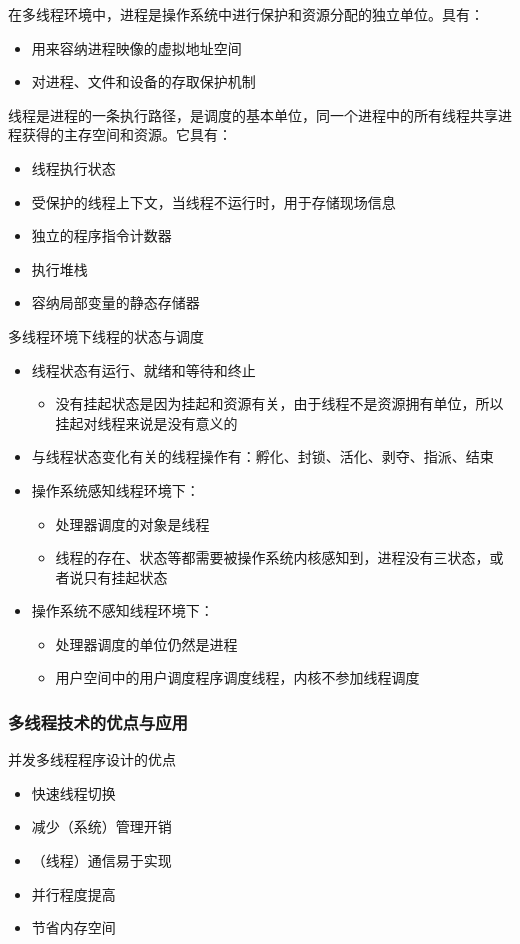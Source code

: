 \documentclass[cs4size,a4paper,10pt]{ctexart}
\begin{document}
	在多线程环境中，进程是操作系统中进行保护和资源分配的独立单位。具有：
	\begin{itemize}
		\item 用来容纳进程映像的虚拟地址空间
		\item 对进程、文件和设备的存取保护机制
	\end{itemize}

	线程是进程的一条执行路径，是调度的基本单位，同一个进程中的所有线程共享进程获得的主存空间和资源。它具有：
	\begin{itemize}
		\item 线程执行状态
		\item 受保护的线程上下文，当线程不运行时，用于存储现场信息
		\item 独立的程序指令计数器
		\item 执行堆栈
		\item 容纳局部变量的静态存储器
	\end{itemize}

	多线程环境下线程的状态与调度

	\begin{itemize}
		\item 线程状态有运行、就绪和等待和终止
		\begin{itemize}
			\item 没有挂起状态是因为挂起和资源有关，由于线程不是资源拥有单位，所以挂起对线程来说是没有意义的
		\end{itemize}
		\item 与线程状态变化有关的线程操作有：孵化、封锁、活化、剥夺、指派、结束
		\item 操作系统感知线程环境下：
		\begin{itemize}
			\item 处理器调度的对象是线程
			\item 线程的存在、状态等都需要被操作系统内核感知到，进程没有三状态，或者说只有挂起状态
		\end{itemize}
		\item 操作系统不感知线程环境下：
		\begin{itemize}
			\item 处理器调度的单位仍然是进程
			\item 用户空间中的用户调度程序调度线程，内核不参加线程调度
		\end{itemize}
	\end{itemize}


	\subsubsection{多线程技术的优点与应用}
	并发多线程程序设计的优点
	\begin{itemize}
		\item 快速线程切换
		\item 减少（系统）管理开销
		\item （线程）通信易于实现
		\item 并行程度提高
		\item 节省内存空间
	\end{itemize}
\end{document}
